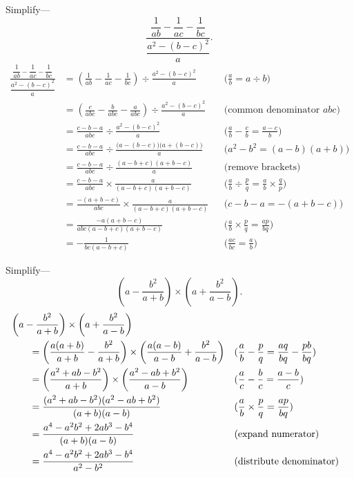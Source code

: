 \documentclass[DIN, pagenumber=false, fontsize=11pt, parskip=half]{scrartcl}
\begin{document}
\begin{problems}[from=1,step=1]
    \problem Simplify---
    \[
        \frac{\dfrac{1}{ab} - \dfrac{1}{ac} - \dfrac{1}{bc}}{\dfrac{a^2 - (b-c)^2}{a}}.
    \]
    \answer
    \begin{align*}
        \frac{\dfrac{1}{ab} - \dfrac{1}{ac} - \dfrac{1}{bc}}{\dfrac{a^2 - (b-c)^2}{a}}
            &= \left(\frac{1}{ab} - \frac{1}{ac} - \frac{1}{bc}\right) \div \frac{a^2 - (b-c)^2}{a} && \text{($\frac{a}{b} = a \div b$)}\\ 
            &= \left(\frac{c}{abc} - \frac{b}{abc} - \frac{a}{abc}\right) \div \frac{a^2 - (b-c)^2}{a} && \text{(common denominator $abc$)}\\ 
            &= \frac{c-b-a}{abc} \div \frac{a^2 - (b-c)^2}{a} && \text{($\frac{a}{b} - \frac{c}{b} = \frac{a-c}{b}$)}\\ 
            &= \frac{c-b-a}{abc} \div \frac{\big(a-(b-c)\big)\big(a+(b-c)\big)}{a} && \text{($a^2-b^2 = (a-b)(a+b)$)}\\ 
            &= \frac{c-b-a}{abc} \div \frac{(a-b+c)(a+b-c)}{a} && \text{(remove brackets)}\\ 
            &= \frac{c-b-a}{abc} \times \frac{a}{(a-b+c)(a+b-c)} && \text{($\frac{a}{b} \div \frac{p}{q} = \frac{a}{b} \times \frac{q}{p}$)}\\ 
            &= \frac{-(a+b-c)}{abc} \times \frac{a}{(a-b+c)(a+b-c)} && \text{($c-b-a = -(a+b-c)$)}\\ 
            &= \frac{-a(a+b-c)}{abc(a-b+c)(a+b-c)} && \text{($\frac{a}{b} \times \frac{p}{q} = \frac{ap}{bq}$)}\\ 
            &= -\frac{1}{bc(a-b+c)} && \text{($\frac{ac}{bc} = \frac{a}{b}$)}
    \end{align*}

    \problem Simplify---
    \[
        \left(a - \frac{b^2}{a+b}\right) \times \left(a + \frac{b^2}{a-b}\right).
    \]
    \answer 
    \begin{align*}
        \MoveEqLeft
        \left(a - \frac{b^2}{a+b}\right) \times \left(a + \frac{b^2}{a-b}\right) \\
        &= \left(\frac{a(a+b)}{a+b} - \frac{b^2}{a+b}\right) \times \left(\frac{a(a-b)}{a-b}+\frac{b^2}{a-b}\right) && \text{($\frac{a}{b} - \frac{p}{q} = \frac{aq}{bq} - \frac{pb}{bq}$)}\\ 
        &= \left(\frac{a^2+ab-b^2}{a+b}\right) \times \left(\frac{a^2-ab+b^2}{a-b}\right) && \text{($\frac{a}{c} - \frac{b}{c} = \frac{a-b}{c}$)}\\ 
        &= \frac{(a^2+ab-b^2)(a^2-ab+b^2)}{(a+b)(a-b)} && \text{($\frac{a}{b} \times \frac{p}{q} = \frac{ap}{bq}$)}\\ 
        &= \frac{a^4-a^2b^2+2ab^3-b^4}{(a+b)(a-b)} && \text{(expand numerator)}\\ 
        &= \frac{a^4-a^2b^2+2ab^3-b^4}{a^2-b^2} && \text{(distribute denominator)}
    \end{align*}


\end{problems}
\end{document}
